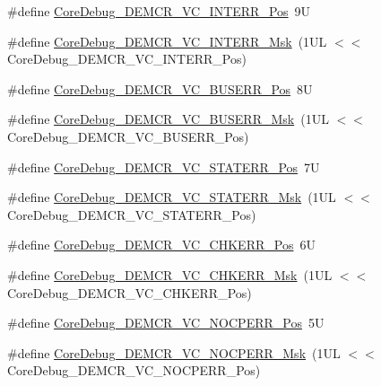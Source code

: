 \begin{DoxyCompactItemize}
\item 
\#define \hyperlink{group___c_m_s_i_s___core_debug_ga22079a6e436f23b90308be97e19cf07e}{Core\+Debug\+\_\+\+D\+E\+M\+C\+R\+\_\+\+V\+C\+\_\+\+I\+N\+T\+E\+R\+R\+\_\+\+Pos}~9U
\item 
\#define \hyperlink{group___c_m_s_i_s___core_debug_gad6815d8e3df302d2f0ff2c2c734ed29a}{Core\+Debug\+\_\+\+D\+E\+M\+C\+R\+\_\+\+V\+C\+\_\+\+I\+N\+T\+E\+R\+R\+\_\+\+Msk}~(1\+U\+L $<$$<$ Core\+Debug\+\_\+\+D\+E\+M\+C\+R\+\_\+\+V\+C\+\_\+\+I\+N\+T\+E\+R\+R\+\_\+\+Pos)
\item 
\#define \hyperlink{group___c_m_s_i_s___core_debug_gab8e3d8f0f9590a51bbf10f6da3ad6933}{Core\+Debug\+\_\+\+D\+E\+M\+C\+R\+\_\+\+V\+C\+\_\+\+B\+U\+S\+E\+R\+R\+\_\+\+Pos}~8U
\item 
\#define \hyperlink{group___c_m_s_i_s___core_debug_ga9d29546aefe3ca8662a7fe48dd4a5b2b}{Core\+Debug\+\_\+\+D\+E\+M\+C\+R\+\_\+\+V\+C\+\_\+\+B\+U\+S\+E\+R\+R\+\_\+\+Msk}~(1\+U\+L $<$$<$ Core\+Debug\+\_\+\+D\+E\+M\+C\+R\+\_\+\+V\+C\+\_\+\+B\+U\+S\+E\+R\+R\+\_\+\+Pos)
\item 
\#define \hyperlink{group___c_m_s_i_s___core_debug_ga16f0d3d2ce1e1e8cd762d938ac56c4ac}{Core\+Debug\+\_\+\+D\+E\+M\+C\+R\+\_\+\+V\+C\+\_\+\+S\+T\+A\+T\+E\+R\+R\+\_\+\+Pos}~7U
\item 
\#define \hyperlink{group___c_m_s_i_s___core_debug_gaa38b947d77672c48bba1280c0a642e19}{Core\+Debug\+\_\+\+D\+E\+M\+C\+R\+\_\+\+V\+C\+\_\+\+S\+T\+A\+T\+E\+R\+R\+\_\+\+Msk}~(1\+U\+L $<$$<$ Core\+Debug\+\_\+\+D\+E\+M\+C\+R\+\_\+\+V\+C\+\_\+\+S\+T\+A\+T\+E\+R\+R\+\_\+\+Pos)
\item 
\#define \hyperlink{group___c_m_s_i_s___core_debug_ga10fc7c53bca904c128bc8e1a03072d50}{Core\+Debug\+\_\+\+D\+E\+M\+C\+R\+\_\+\+V\+C\+\_\+\+C\+H\+K\+E\+R\+R\+\_\+\+Pos}~6U
\item 
\#define \hyperlink{group___c_m_s_i_s___core_debug_ga2f98b461d19746ab2febfddebb73da6f}{Core\+Debug\+\_\+\+D\+E\+M\+C\+R\+\_\+\+V\+C\+\_\+\+C\+H\+K\+E\+R\+R\+\_\+\+Msk}~(1\+U\+L $<$$<$ Core\+Debug\+\_\+\+D\+E\+M\+C\+R\+\_\+\+V\+C\+\_\+\+C\+H\+K\+E\+R\+R\+\_\+\+Pos)
\item 
\#define \hyperlink{group___c_m_s_i_s___core_debug_gac9d13eb2add61f610d5ced1f7ad2adf8}{Core\+Debug\+\_\+\+D\+E\+M\+C\+R\+\_\+\+V\+C\+\_\+\+N\+O\+C\+P\+E\+R\+R\+\_\+\+Pos}~5U
\item 
\#define \hyperlink{group___c_m_s_i_s___core_debug_ga03ee58b1b02fdbf21612809034562f1c}{Core\+Debug\+\_\+\+D\+E\+M\+C\+R\+\_\+\+V\+C\+\_\+\+N\+O\+C\+P\+E\+R\+R\+\_\+\+Msk}~(1\+U\+L $<$$<$ Core\+Debug\+\_\+\+D\+E\+M\+C\+R\+\_\+\+V\+C\+\_\+\+N\+O\+C\+P\+E\+R\+R\+\_\+\+Pos)
$$
\end{DoxyCompactItemize}
